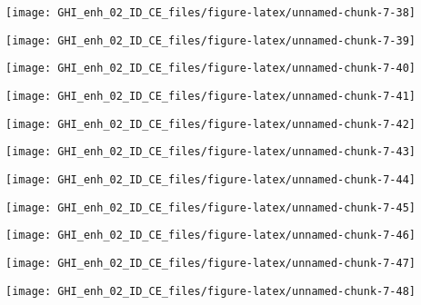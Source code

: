 \documentclass[
  10pt,
  a4paper,oneside]{article}
\begin{document}
\begin{center}\texttt{[image: GHI\_enh\_02\_ID\_CE\_files/figure-latex/unnamed-chunk-7-38]} \end{center}

\begin{center}\texttt{[image: GHI\_enh\_02\_ID\_CE\_files/figure-latex/unnamed-chunk-7-39]} \end{center}

\begin{center}\texttt{[image: GHI\_enh\_02\_ID\_CE\_files/figure-latex/unnamed-chunk-7-40]} \end{center}

\begin{center}\texttt{[image: GHI\_enh\_02\_ID\_CE\_files/figure-latex/unnamed-chunk-7-41]} \end{center}

\begin{center}\texttt{[image: GHI\_enh\_02\_ID\_CE\_files/figure-latex/unnamed-chunk-7-42]} \end{center}

\begin{center}\texttt{[image: GHI\_enh\_02\_ID\_CE\_files/figure-latex/unnamed-chunk-7-43]} \end{center}

\begin{center}\texttt{[image: GHI\_enh\_02\_ID\_CE\_files/figure-latex/unnamed-chunk-7-44]} \end{center}

\begin{center}\texttt{[image: GHI\_enh\_02\_ID\_CE\_files/figure-latex/unnamed-chunk-7-45]} \end{center}

\begin{center}\texttt{[image: GHI\_enh\_02\_ID\_CE\_files/figure-latex/unnamed-chunk-7-46]} \end{center}

\begin{center}\texttt{[image: GHI\_enh\_02\_ID\_CE\_files/figure-latex/unnamed-chunk-7-47]} \end{center}

\begin{center}\texttt{[image: GHI\_enh\_02\_ID\_CE\_files/figure-latex/unnamed-chunk-7-48]} \end{center}
\end{document}
